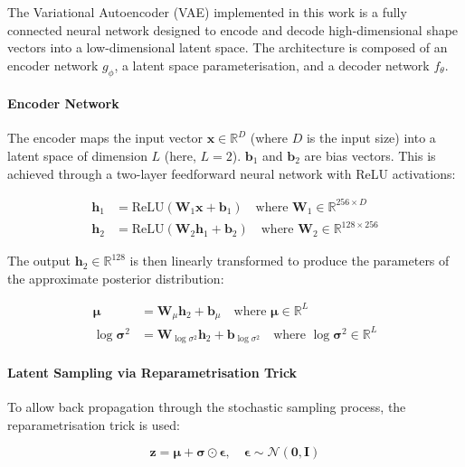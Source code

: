 \documentclass{article}
\begin{document}
The Variational Autoencoder (VAE) implemented in this work is a fully connected neural network designed to encode and decode high-dimensional shape vectors into a low-dimensional latent space. The architecture is composed of an encoder network $g_\phi$, a latent space parameterisation, and a decoder network $f_\theta$.

\paragraph{Encoder Network}

The encoder maps the input vector $\mathbf{x} \in \mathbb{R}^D$ (where $D$ is the input size) into a latent space of dimension $L$ (here, $L = 2$). $\textbf{b}_1$ and $\textbf{b}_2$ are bias vectors. This is achieved through a two-layer feedforward neural network with ReLU activations:

\begin{align}
\mathbf{h}_1 &= \text{ReLU}(\mathbf{W}_1 \mathbf{x} + \mathbf{b}_1) \quad \text{where } \mathbf{W}_1 \in \mathbb{R}^{256 \times D} \\
\mathbf{h}_2 &= \text{ReLU}(\mathbf{W}_2 \mathbf{h}_1 + \mathbf{b}_2) \quad \text{where } \mathbf{W}_2 \in \mathbb{R}^{128 \times 256}
\end{align}

The output $\mathbf{h}_2 \in \mathbb{R}^{128}$ is then linearly transformed to produce the parameters of the approximate posterior distribution:

\begin{align}
\boldsymbol{\mu} &= \mathbf{W}_\mu \mathbf{h}_2 + \mathbf{b}_\mu \quad \text{where } \boldsymbol{\mu} \in \mathbb{R}^L \\
\log \boldsymbol{\sigma}^2 &= \mathbf{W}_{\log\sigma^2} \mathbf{h}_2 + \mathbf{b}_{\log\sigma^2} \quad \text{where } \log \boldsymbol{\sigma}^2 \in \mathbb{R}^L
\end{align}

\paragraph{Latent Sampling via Reparametrisation Trick}

To allow back propagation through the stochastic sampling process, the reparametrisation trick is used:

\begin{equation}
\mathbf{z} = \boldsymbol{\mu} + \boldsymbol{\sigma} \odot \boldsymbol{\epsilon}, \quad \boldsymbol{\epsilon} \sim \mathcal{N}(\mathbf{0}, \mathbf{I})
\end{equation}
\end{document}
